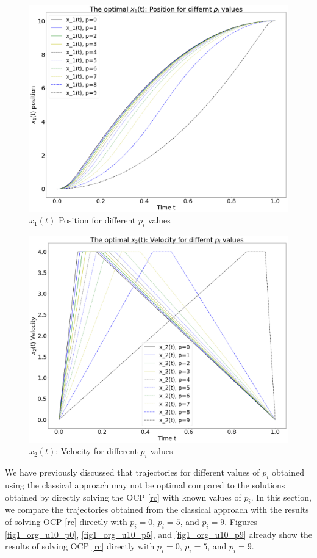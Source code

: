 \documentclass  [
  paper    = a4,
  BCOR     = 10mm,
  twoside,
  fontsize = 12pt,
  fleqn,
  toc      = bibnumbered,
  toc      = listofnumbered,
  numbers  = noendperiod,
  headings = normal,
  listof   = leveldown,
  version  = 3.03
]                                       {scrreprt}
\newcommand{\<}{\langle}
\renewcommand{\>}{\rangle}
\begin{document}
\begin{figure}[H]
	\centerline{\includegraphics[width=13cm]{ca_st_pis.png}}
	\caption{$x_1(t)$ Position for different $p_i$ values}
	\label{fig_ca_st_pis}
\end{figure}

\begin{figure}[H]
	\centerline{\includegraphics[width=13cm]{ca_vt_pis.png}}
	\caption{$x_2(t)$: Velocity for different $p_i$ values}
	\label{fig_ca_vt_pis}
\end{figure}


We have previously discussed that trajectories for different values of $p_i$ obtained using the classical approach may not be optimal compared to the solutions obtained by directly solving the OCP \ref{rc} with known values of $p_i$. In this section, we compare the trajectories obtained from the classical approach with the results of solving OCP \ref{rc} directly with $p_i=0$, $p_i=5$, and $p_i=9$. Figures \ref{fig1_org_u10_p0}, \ref{fig1_org_u10_p5}, and \ref{fig1_org_u10_p9} already show the results of solving OCP \ref{rc} directly with $p_i=0$, $p_i=5$, and $p_i=9$.
\end{document}
